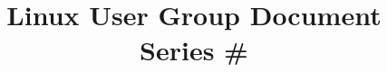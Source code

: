 
\title{
	\vspace{-2cm}
	\begin{flushleft}
		\Huge\bfseries\color{lugblue}
		\sessiontitle
	\end{flushleft}
	\vspace{-0.5cm}
	\begin{flushleft}
		\Large\color{lugdark}
		Linux User Group Document Series \#\sessionnumber
	\end{flushleft}
}

\date{\large\sessiondate}

\newcommand{\makeabstract}{
	\begin{center}
		\colorbox{luglight}{
			\begin{minipage}{0.8\textwidth}
				\centering
				\vspace{0.5cm}
				\Large\textbf{Document Abstract}
				\vspace{0.3cm}
				
				\normalsize
				\sessionabstract
				\vspace{0.5cm}
			\end{minipage}
		}
	\end{center}
}

\newcommand{\makelicense}{
	\begin{center}
		\small\textit{This document is released under the Creative Commons Attribution 4.0 International License}
	\end{center}
}